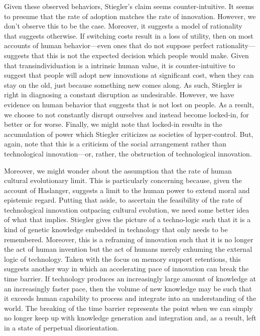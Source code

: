 \documentclass[letterpaper,notitlepage,12pt]{article}
\begin{document}
Given these observed behaviors, Stiegler's claim seems counter-intuitive.
It seems to presume that the rate of adoption matches the rate of innovation.
However, we don't observe this to be the case.
Moreover, it suggests a model of rationality that suggests otherwise.
If switching costs result in a loss of utility, then on most accounts of human
behavior---even ones that do not suppose perfect rationality---suggests that
this is not the expected decision which people would make.
Given that transindividuation is a intrinsic human value, it is
counter-intuitive to suggest that people will adopt new innovations at
significant cost, when they can stay on the old, just because something new
comes along.
As such, Stiegler is right in diagnosing a constant disruption as undesirable.
However, we have evidence on human behavior that suggests that is not lost on
people.
As a result, we choose to not constantly disrupt ourselves and instead become
locked-in, for better or for worse.
Finally, we might note that locked-in results in the accumulation of power which
Stiegler criticizes as societies of hyper-control.
But, again, note that this is a criticism of the social arrangement rather than
technological innovation---or, rather, the obstruction of technological
innovation.

Moreover, we might wonder about the assumption that the rate of human cultural
evolutionary limit.
This is particularly concerning because, given the account of Haslanger,
suggests a limit to the human power to extend moral and epistemic regard.
Putting that aside, to ascertain the feasibility of the rate of technological
innovation outpacing cultural evolution, we need some better idea of what that
implies.
Stiegler gives the picture of a techno-logic such that it is a kind of genetic
knowledge embedded in technology that only needs to be remembered.
Moreover, this is a reframing of innovation such that it is no longer the act of
human invention but the act of humans merely exhuming the external logic of
technology.
Taken with the focus on memory support retentions, this suggests another way in
which an accelerating pace of innovation can break the time barrier.
If technology produces an increasingly large amount of knowledge at an
increasingly faster pace, then the volume of new knowledge may be such that it
exceeds human capability to process and integrate into an understanding of the
world.
The breaking of the time barrier represents the point when we can simply no
longer keep up with knowledge generation and integration and, as a result, left
in a state of perpetual disorientation.
\end{document}
